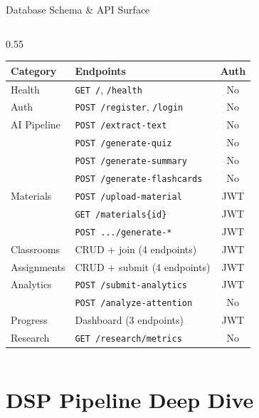 \documentclass[aspectratio=169,10pt]{beamer}
\begin{document}
\begin{frame}{Database Schema \& API Surface}
\begin{columns}[T]
\begin{column}{0.55\textwidth}
\vspace{2pt}
\footnotesize
\begin{tabular}{@{}llc@{}}
\toprule
\textbf{Category} & \textbf{Endpoints} & \textbf{Auth} \\
\midrule
Health & \texttt{GET /}, \texttt{/health} & No \\
Auth & \texttt{POST /register}, \texttt{/login} & No \\
\midrule
AI Pipeline & \texttt{POST /extract-text} & No \\
 & \texttt{POST /generate-quiz} & No \\
 & \texttt{POST /generate-summary} & No \\
 & \texttt{POST /generate-flashcards} & No \\
\midrule
Materials & \texttt{POST /upload-material} & JWT \\
 & \texttt{GET /materials\{id\}} & JWT \\
 & \texttt{POST .../generate-*} & JWT \\
\midrule
Classrooms & CRUD + join (4 endpoints) & JWT \\
Assignments & CRUD + submit (4 endpoints) & JWT \\
Analytics & \texttt{POST /submit-analytics} & JWT \\
 & \texttt{POST /analyze-attention} & No \\
Progress & Dashboard (3 endpoints) & JWT \\
Research & \texttt{GET /research/metrics} & No \\
\bottomrule
\end{tabular}
\end{column}
\end{columns}
\end{frame}

\section{DSP Pipeline Deep Dive}
\end{document}
